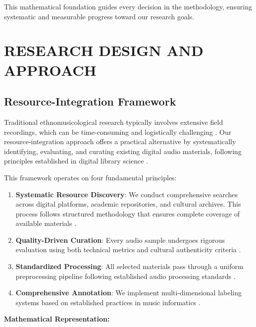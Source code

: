 \documentclass[12pt,a4paper]{article}
\begin{document}
This mathematical foundation guides every decision in the methodology, ensuring systematic and measurable progress toward our research goals.

\section{RESEARCH DESIGN AND APPROACH}

\subsection{Resource-Integration Framework}

Traditional ethnomusicological research typically involves extensive field recordings, which can be time-consuming and logistically challenging \citep{rice2014ethnomusicology, barz2008shadows}. Our resource-integration approach offers a practical alternative by systematically identifying, evaluating, and curating existing digital audio materials, following principles established in digital library science \citep{arms2000digital, borgman2015big}.

This framework operates on four fundamental principles:

\begin{enumerate}
\item \textbf{Systematic Resource Discovery}: We conduct comprehensive searches across digital platforms, academic repositories, and cultural archives. This process follows structured methodology that ensures complete coverage of available materials \citep{terras2015digitisation, zorich2012transitioning}.

\item \textbf{Quality-Driven Curation}: Every audio sample undergoes rigorous evaluation using both technical metrics and cultural authenticity criteria \citep{casey2008content, klapuri2006signal}.

\item \textbf{Standardized Processing}: All selected materials pass through a uniform preprocessing pipeline following established audio processing standards \citep{zolzer2011dafx, orfanidis2007introduction}.

\item \textbf{Comprehensive Annotation}: We implement multi-dimensional labeling systems based on established practices in music informatics \citep{downie2003music, schedl2014music}.
\end{enumerate}

\textbf{Mathematical Representation:}
\end{document}
